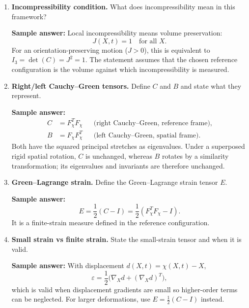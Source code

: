\documentclass[12pt]{article}
\begin{document}
\begin{enumerate}
\textbf{Sample answer:}
\[
F_\chi=
\begin{pmatrix}
1&\gamma&0\\
0&1&0\\
0&0&1
\end{pmatrix},
\qquad
J=\det(F_\chi)=1.
\]
So simple shear is volume-preserving.

\item \textbf{Incompressibility condition.}
What does incompressibility mean in this framework?

\textbf{Sample answer:}
Local incompressibility means volume preservation:
\[
J(X,t)=1\quad \text{for all } X.
\]
For an orientation-preserving motion ($J>0$), this is equivalent to
$I_3=\det(C)=J^2=1$. The statement assumes that the chosen reference configuration
is the volume against which incompressibility is measured.

\item \textbf{Right/left Cauchy--Green tensors.}
Define $C$ and $B$ and state what they represent.

\textbf{Sample answer:}
\[
\begin{aligned}
C &= F_\chi^T F_\chi && \text{(right Cauchy--Green, reference frame)},\\
B &= F_\chi F_\chi^T && \text{(left Cauchy--Green, spatial frame)}.
\end{aligned}
\]
Both have the squared principal stretches as eigenvalues. Under a superposed rigid
spatial rotation, $C$ is unchanged, whereas $B$ rotates by a similarity transformation;
its eigenvalues and invariants are therefore unchanged.

\item \textbf{Green--Lagrange strain.}
Define the Green--Lagrange strain tensor $E$.

\textbf{Sample answer:}
\[
E=\frac12(C-I)=\frac12(F_\chi^T F_\chi - I).
\]
It is a finite-strain measure defined in the reference configuration.

\item \textbf{Small strain vs finite strain.}
State the small-strain tensor and when it is valid.

\textbf{Sample answer:}
With displacement $d(X,t)=\chi(X,t)-X$,
\[
\varepsilon=\frac12\bigl(\nabla_X d + (\nabla_X d)^T\bigr),
\]
which is valid when displacement gradients are small so higher-order terms can be neglected.
For larger deformations, use $E=\tfrac12(C-I)$ instead.


\end{enumerate}
\end{document}
